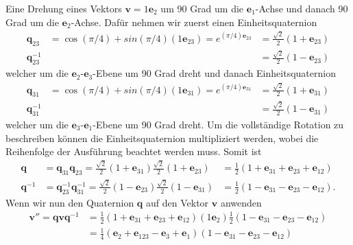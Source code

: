 \begin{beispiel}
	Eine Drehung eines Vektors $\mathbf{v}= 1\mathbf{e}_2$ um 90 Grad um die $\mathbf{e}_1$-Achse und danach 90 Grad um die $\mathbf{e}_2$-Achse. Dafür nehmen wir zuerst einen Einheitsquaternion 
	\begin{align}
		\mathbf{q}_{23} &= \cos(\pi/4) + sin(\pi/4)(1\mathbf{e}_{23}) =  e^{(\pi/4)\mathbf{e}_{23}} &= \textstyle{\frac{\sqrt{2}}{2}}(1 + \mathbf{e}_{23})\\
		\mathbf{q}_{23}^{-1} &&= \textstyle{\frac{\sqrt{2}}{2}} (1- \mathbf{e}_{23})
	\end{align}
	welcher um die $\mathbf{e}_{2}$-$\mathbf{e}_{3}$-Ebene um 90 Grad dreht und danach Einheitsquaternion 
	\begin{align}
		\mathbf{q}_{31} &= \cos(\pi/4) + sin(\pi/4)(1\mathbf{e}_{31}) =  e^{(\pi/4)\mathbf{e}_{31}} &= \textstyle{\frac{\sqrt{2}}{2}}(1 + \mathbf{e}_{31})\\
		\mathbf{q}_{31}^{-1} &&= \textstyle{\frac{\sqrt{2}}{2}}(1 - \mathbf{e}_{31})
	\end{align}
	welcher um die $\mathbf{e}_{3}$-$\mathbf{e}_{1}$-Ebene  um 90 Grad dreht. Um die vollständige Rotation zu beschreiben können die  Einheitsquaternion multipliziert werden, wobei die Reihenfolge der Ausführung beachtet werden muss. Somit ist
	\begin{align} \label{FormelBeispielQuaternion}
		\mathbf{q} &= \mathbf{q}_{31}\mathbf{q}_{23} = \textstyle{\frac{\sqrt{2}}{2}}(1 + \mathbf{e}_{31})\textstyle{\frac{\sqrt{2}}{2}}(1 + \mathbf{e}_{23}) &= \textstyle{\frac{1}{2}}(1 + \mathbf{e}_{31} + \mathbf{e}_{23} + \mathbf{e}_{12})\\
		\mathbf{q}^{-1} &= \mathbf{q}_{23}^{-1}\mathbf{q}_{31}^{-1} = \textstyle{\frac{\sqrt{2}}{2}} (1- \mathbf{e}_{23})\textstyle{\frac{\sqrt{2}}{2}}(1 -\mathbf{e}_{31}) &= \textstyle{\frac{1}{2}}(1 - \mathbf{e}_{31} - \mathbf{e}_{23} - \mathbf{e}_{12}).
	\end{align}
	Wenn wir nun den Quaternion $\mathbf{q}$ auf den Vektor $\mathbf{v}$ anwenden
	\begin{align}
		\mathbf{v}'' = \mathbf{qvq}^{-1} &= \textstyle{\frac{1}{2}}(1 + \mathbf{e}_{31} +  \mathbf{e}_{23} +  \mathbf{e}_{12})(1\mathbf{e}_2)\textstyle{\frac{1}{2}}(1 - \mathbf{e}_{31} -  \mathbf{e}_{23} -  \mathbf{e}_{12})\\ 
		&= \textstyle{\frac{1}{4}}(\mathbf{e}_2 +  \mathbf{e}_{123} -  \mathbf{e}_3 +  \mathbf{e}_1)(1 - \mathbf{e}_{31} -  \mathbf{e}_{23} -  \mathbf{e}_{12})\\

\end{align}
\end{beispiel}
